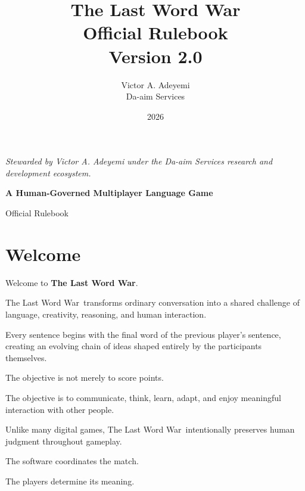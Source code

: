 \documentclass[11pt,a4paper]{article}
\title{
\Huge\textbf{The Last Word War\texttrademark}\\[0.5em]
\Large Official Rulebook\\[0.5em]
\large Version 2.0
}
\author{
Victor A. Adeyemi\\
Da-aim Services
}
\date{2026}
\begin{document}
\maketitle

\begin{center}
\textit{
Stewarded by Victor A. Adeyemi under the Da-aim Services research and development ecosystem.
}
\end{center}

\vspace{1em}

\begin{center}
\textbf{A Human-Governed Multiplayer Language Game}
\end{center}

\vspace{1em}

\begin{center}
\large
Official Rulebook
\end{center}

\vspace{1em}

\tableofcontents

\newpage

\section{Welcome}

Welcome to \textbf{The Last Word War\texttrademark}.

The Last Word War\texttrademark\ transforms ordinary conversation into a shared challenge of language, creativity, reasoning, and human interaction.

Every sentence begins with the final word of the previous player's sentence, creating an evolving chain of ideas shaped entirely by the participants themselves.

The objective is not merely to score points.

The objective is to communicate, think, learn, adapt, and enjoy meaningful interaction with other people.

Unlike many digital games, The Last Word War\texttrademark\ intentionally preserves human judgment throughout gameplay.

The software coordinates the match.

The players determine its meaning.

\end{document}
